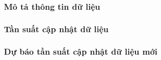\documentclass{beamer}
\begin{document}
\subsubsection{Mô tả thông tin dữ liệu}
\subsubsection{Tần suất cập nhật dữ liệu}
\subsubsection{Dự báo tần suất cập nhật dữ liệu mới}
\end{document}
